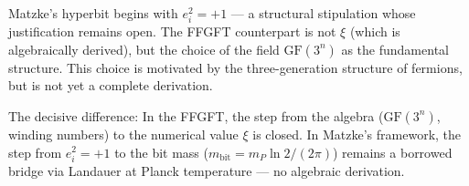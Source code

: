 Matzke's hyperbit begins with $e_i^2 = +1$ --- a structural
stipulation whose justification remains open. The FFGFT counterpart is not
$\xi$ (which is algebraically derived), but the choice of the field
$\mathrm{GF}(3^n)$ as the fundamental structure. This choice is motivated by the
three-generation structure of fermions, but is not yet a
complete derivation.

The decisive difference: In the FFGFT, the step from the
algebra ($\mathrm{GF}(3^n)$, winding numbers) to the numerical value $\xi$ is closed.
In Matzke's framework, the step from $e_i^2 = +1$ to the bit mass
($m_{\text{bit}} = m_P \ln 2 / (2\pi)$) remains a borrowed bridge via Landauer
at Planck temperature --- no algebraic derivation.